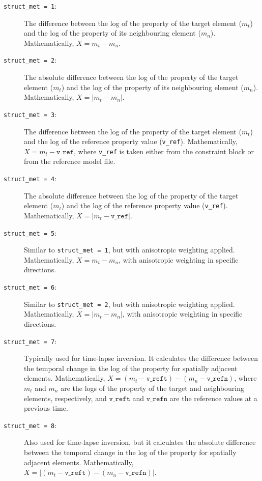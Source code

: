 \documentclass[a4paper,12pt]{article}
\begin{document}
\begin{description}
    \item[\texttt{struct\_met = 1}:] The difference between the log of the property of the target element (\( m_t \)) and the log of the property of its neighbouring element (\( m_n \)). Mathematically, \( X = m_t - m_n \).

    \item[\texttt{struct\_met = 2}:] The absolute difference between the log of the property of the target element (\( m_t \)) and the log of the property of its neighbouring element (\( m_n \)). Mathematically, \( X = |m_t - m_n| \).

    \item[\texttt{struct\_met = 3}:] The difference between the log of the property of the target element (\( m_t \)) and the log of the reference property value (\texttt{v\_ref}). Mathematically, \( X = m_t - \texttt{v\_ref} \), where \texttt{v\_ref} is taken either from the constraint block or from the reference model file.

    \item[\texttt{struct\_met = 4}:] The absolute difference between the log of the property of the target element (\( m_t \)) and the log of the reference property value (\texttt{v\_ref}). Mathematically, \( X = |m_t - \texttt{v\_ref}| \).

    \item[\texttt{struct\_met = 5}:] Similar to \texttt{struct\_met = 1}, but with anisotropic weighting applied. Mathematically, \( X = m_t - m_n \), with anisotropic weighting in specific directions.

    \item[\texttt{struct\_met = 6}:] Similar to \texttt{struct\_met = 2}, but with anisotropic weighting applied. Mathematically, \( X = |m_t - m_n| \), with anisotropic weighting in specific directions.

    \item[\texttt{struct\_met = 7}:] Typically used for time-lapse inversion. It calculates the difference between the temporal change in the log of the property for spatially adjacent elements. Mathematically, \( X = (m_t - \texttt{v\_reft}) - (m_n - \texttt{v\_refn}) \), where \( m_t \) and \( m_n \) are the logs of the property of the target and neighbouring elements, respectively, and \( \texttt{v\_reft} \) and \( \texttt{v\_refn} \) are the reference values at a previous time.

    \item[\texttt{struct\_met = 8}:] Also used for time-lapse inversion, but it calculates the absolute difference between the temporal change in the log of the property for spatially adjacent elements. Mathematically, \( X = |(m_t - \texttt{v\_reft}) - (m_n - \texttt{v\_refn})| \).


\end{description}
\end{document}
